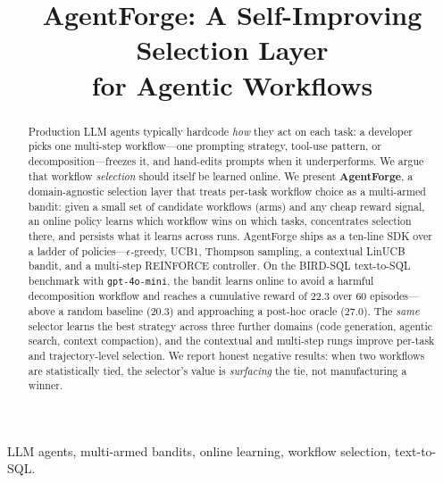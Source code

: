 \documentclass[conference]{IEEEtran}
\newcommand{\code}[1]{\texttt{#1}}
\begin{document}
\title{AgentForge: A Self-Improving Selection Layer\\ for Agentic Workflows}

\author{%
}

\maketitle

\begin{abstract}
Production LLM agents typically hardcode \emph{how} they act on each task: a
developer picks one multi-step workflow---one prompting strategy, tool-use
pattern, or decomposition---freezes it, and hand-edits prompts when it
underperforms. We argue that workflow \emph{selection} should itself be learned
online. We present \textbf{AgentForge}, a domain-agnostic selection layer that
treats per-task workflow choice as a multi-armed bandit: given a small set of
candidate workflows (arms) and any cheap reward signal, an online policy learns
which workflow wins on which tasks, concentrates selection there, and persists
what it learns across runs. AgentForge ships as a ten-line SDK over a ladder of
policies---$\epsilon$-greedy, UCB1, Thompson sampling, a contextual LinUCB
bandit, and a multi-step REINFORCE controller. On the BIRD-SQL text-to-SQL
benchmark with \code{gpt-4o-mini}, the bandit learns online to avoid a harmful
decomposition workflow and reaches a cumulative reward of $22.3$ over $60$
episodes---above a random baseline ($20.3$) and approaching a post-hoc oracle
($27.0$). The \emph{same} selector learns the best strategy across three further
domains (code generation, agentic search, context compaction), and the
contextual and multi-step rungs improve per-task and trajectory-level selection.
We report honest negative results: when two workflows are statistically tied,
the selector's value is \emph{surfacing} the tie, not manufacturing a winner.
\end{abstract}

\begin{IEEEkeywords}
LLM agents, multi-armed bandits, online learning, workflow selection, text-to-SQL.
\end{IEEEkeywords}

\end{document}
